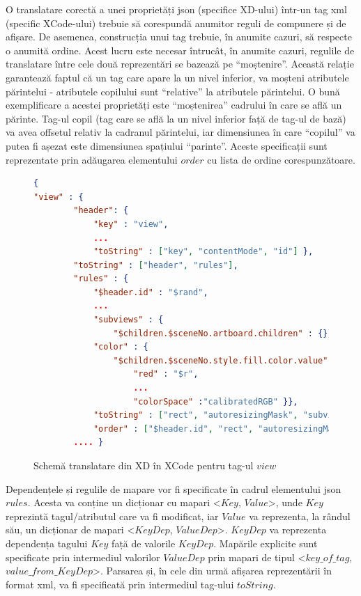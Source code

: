 O translatare corectă a unei proprietăți json (specifice XD-ului) într-un tag xml (specific XCode-ului) trebuie să corespundă anumitor reguli de compunere și de afișare. De asemenea, construcția unui tag trebuie, în anumite cazuri, să respecte o anumită ordine. Acest lucru este necesar întrucât, în anumite cazuri, regulile de translatare între cele două reprezentări se bazează pe “moștenire”. Această relație garantează faptul că un tag care apare la un nivel inferior, va moșteni atributele părintelui - atributele copilului sunt “relative” la atributele părintelui. O bună exemplificare a acestei proprietăți este “moștenirea” cadrului în care se află un părinte. Tag-ul copil (tag care se află la un nivel inferior față de tag-ul de bază) va avea offsetul relativ la cadranul părintelui, iar dimensiunea în care “copilul” va putea fi așezat este dimensiunea spațiului “parinte”. Aceste specificații sunt reprezentate prin adăugarea elementului $order$ cu lista de ordine corespunzătoare.

\begin{figure}
\begin{lstlisting}[language=json,firstnumber=1]
{
"view" : {
        "header": {
            "key" : "view",
            ...
            "toString" : ["key", "contentMode", "id"] },
        "toString" : ["header", "rules"],
        "rules" : { 
            "$header.id" : "$rand",
            ...
            "subviews" : {
                "$children.$sceneNo.artboard.children" : {}},
            "color" : {
                "$children.$sceneNo.style.fill.color.value" : {
                    "red" : "$r",
                    ...
                    "colorSpace" :"calibratedRGB" }},
            "toString" : ["rect", "autoresizingMask", "subviews", "color"],
            "order" : ["$header.id", "rect", "autoresizingMask", "color", "subviews"] }
        .... }
\end{lstlisting}
\caption{Schemă translatare din XD în XCode pentru tag-ul $view$} \label{fig:XD2XCode Schema}
\end{figure}

Dependențele și regulile de mapare vor fi specificate în cadrul elementului json $rules$. Acesta va conține un dicționar cu mapari <$Key$, $Value$>, unde $Key$ reprezintă tagul/atributul care va fi modificat, iar $Value$ va reprezenta, la rândul său, un dicționar de mapari <$KeyDep$, $ValueDep$>.  $KeyDep$ va reprezenta dependența tagului $Key$ față de valorile $KeyDep$. Mapările explicite sunt specificate prin intermediul valorilor $ValueDep$ prin mapari de tipul <$key\_of\_tag$, $value\_from\_KeyDep$>. 
Parsarea și, în cele din urmă afișarea reprezentării în format xml, va fi specificată prin intermediul tag-ului $toString$. 

